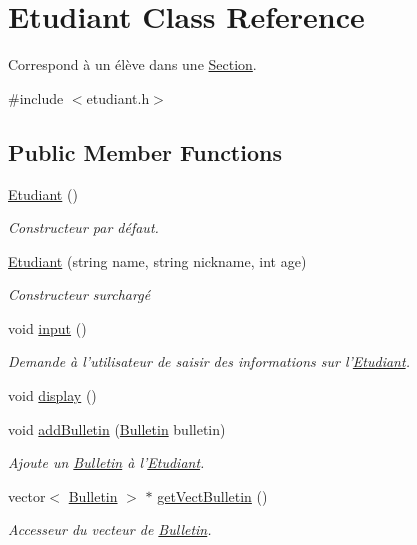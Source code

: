 \hypertarget{class_etudiant}{\section{Etudiant Class Reference}
\label{class_etudiant}
}


Correspond à un élève dans une \hyperlink{class_section}{Section}.  




{\ttfamily \#include $<$etudiant.\-h$>$}

\subsection*{Public Member Functions}
\begin{DoxyCompactItemize}
\item 
\hypertarget{class_etudiant_abfb4e7f3a5faac571517798e059242a4}{\hyperlink{class_etudiant_abfb4e7f3a5faac571517798e059242a4}{Etudiant} ()}\label{class_etudiant_abfb4e7f3a5faac571517798e059242a4}

\begin{DoxyCompactList}\small\item\em Constructeur par défaut. \end{DoxyCompactList}\item 
\hyperlink{class_etudiant_ae56df647746c248e8825de9f0c7aef2a}{Etudiant} (string name, string nickname, int age)
\begin{DoxyCompactList}\small\item\em Constructeur surchargé \end{DoxyCompactList}\item 
\hypertarget{class_etudiant_a37433540e5c7b724de0964a5ecbbead8}{void \hyperlink{class_etudiant_a37433540e5c7b724de0964a5ecbbead8}{input} ()}\label{class_etudiant_a37433540e5c7b724de0964a5ecbbead8}

\begin{DoxyCompactList}\small\item\em Demande à l'utilisateur de saisir des informations sur l'\hyperlink{class_etudiant}{Etudiant}. \end{DoxyCompactList}\item 
void \hyperlink{class_etudiant_afb95ac0c74157e6065e1de603c54381c}{display} ()
\item 
void \hyperlink{class_etudiant_a44d8e2904da296377edc3f85ef23bb6c}{add\-Bulletin} (\hyperlink{class_bulletin}{Bulletin} bulletin)
\begin{DoxyCompactList}\small\item\em Ajoute un \hyperlink{class_bulletin}{Bulletin} à l'\hyperlink{class_etudiant}{Etudiant}. \end{DoxyCompactList}\item 
vector$<$ \hyperlink{class_bulletin}{Bulletin} $>$ $\ast$ \hyperlink{class_etudiant_ac887cfae2127f8a6051447cab254634d}{get\-Vect\-Bulletin} ()
\begin{DoxyCompactList}\small\item\em Accesseur du vecteur de \hyperlink{class_bulletin}{Bulletin}. \end{DoxyCompactList}\end{DoxyCompactItemize}
